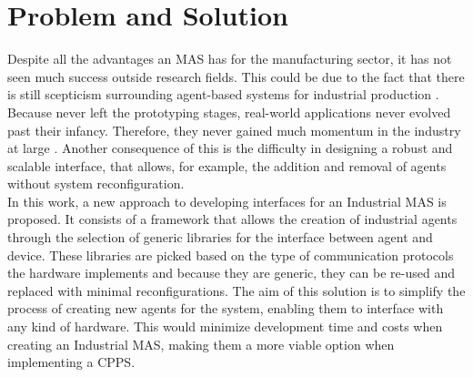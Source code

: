 \section{Problem and Solution}
\label{sec:problem_and_solution}

Despite all the advantages an \acrshort{MAS} has for the manufacturing sector, it has not seen much success outside research fields. This could be due to the fact that there is still scepticism surrounding agent-based systems for industrial production \cite{bottling_plant_part2}. Because  never left the prototyping stages, real-world applications never evolved past their infancy. Therefore, they never gained much momentum in the industry at large \cite{karnouskos02}. Another consequence of this is the difficulty in designing a robust and scalable interface, that allows, for example, the addition and removal of agents without system reconfiguration.\\

In this work, a new approach to developing interfaces for an Industrial \acrshort{MAS} is proposed. It consists of a framework that allows the creation of industrial agents through the selection of generic libraries for the interface between agent and device. These libraries are picked based on the type of communication protocols the hardware implements and because they are generic, they can be re-used and replaced with minimal reconfigurations. The aim of this solution is to simplify the process of creating new agents for the system, enabling them to interface with any kind of hardware. This would minimize development time and costs when creating an Industrial \acrshort{MAS}, making them a more viable option when implementing a \acrshort{CPPS}. 